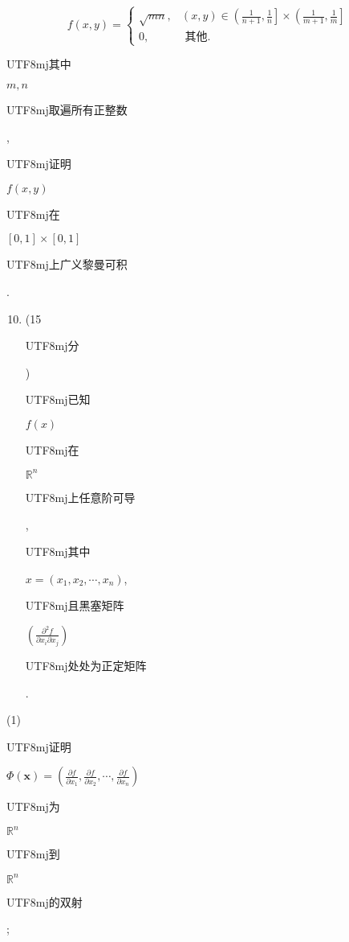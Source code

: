 \documentclass[10pt]{article}
\begin{document}
$$
f(x, y)= \begin{cases}\sqrt{m n}, & (x, y) \in\left(\frac{1}{n+1}, \frac{1}{n}\right] \times\left(\frac{1}{m+1}, \frac{1}{m}\right] \\ 0, & \text { 其他. }\end{cases}
$$
\begin{CJK}{UTF8}{mj}其中\end{CJK} $m, n$ \begin{CJK}{UTF8}{mj}取遍所有正整数\end{CJK}, \begin{CJK}{UTF8}{mj}证明\end{CJK} $f(x, y)$ \begin{CJK}{UTF8}{mj}在\end{CJK} $[0,1] \times[0,1]$ \begin{CJK}{UTF8}{mj}上广义黎曼可积\end{CJK}.

\begin{enumerate}
  \setcounter{enumi}{9}
  \item (15 \begin{CJK}{UTF8}{mj}分\end{CJK}) \begin{CJK}{UTF8}{mj}已知\end{CJK} $f(x)$ \begin{CJK}{UTF8}{mj}在\end{CJK} $\mathbb{R}^{n}$ \begin{CJK}{UTF8}{mj}上任意阶可导\end{CJK}, \begin{CJK}{UTF8}{mj}其中\end{CJK} $x=\left(x_{1}, x_{2}, \cdots, x_{n}\right)$, \begin{CJK}{UTF8}{mj}且黑塞矩阵\end{CJK} $\left(\frac{\partial^{2} f}{\partial x_{i} \partial x_{j}}\right)$ \begin{CJK}{UTF8}{mj}处处为正定矩阵\end{CJK}.
\end{enumerate}
(1) \begin{CJK}{UTF8}{mj}证明\end{CJK} $\Phi(\boldsymbol{x})=\left(\frac{\partial f}{\partial x_{1}}, \frac{\partial f}{\partial x_{2}}, \cdots, \frac{\partial f}{\partial x_{n}}\right)$ \begin{CJK}{UTF8}{mj}为\end{CJK} $\mathbb{R}^{n}$ \begin{CJK}{UTF8}{mj}到\end{CJK} $\mathbb{R}^{n}$ \begin{CJK}{UTF8}{mj}的双射\end{CJK};
\end{document}
